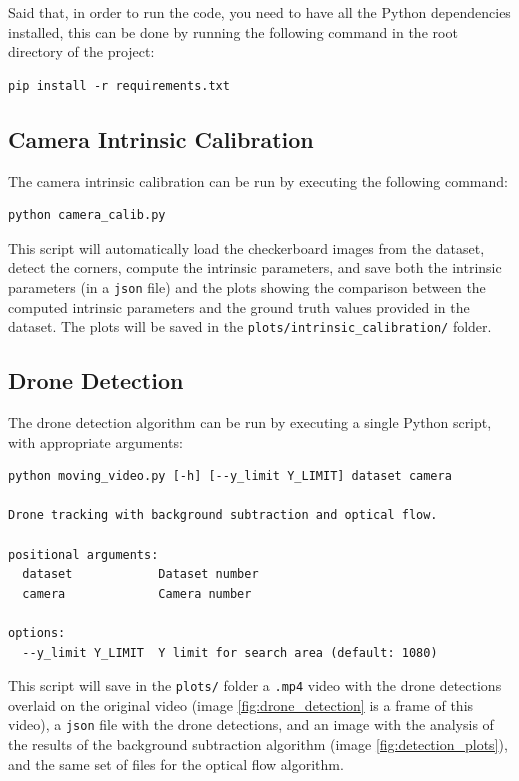 \documentclass[11pt]{article}
\begin{document}
Said that, in order to run the code, you need to have all the Python dependencies installed, this can be done by running the following command in the root directory of the project:

\begin{verbatim}
pip install -r requirements.txt
\end{verbatim}

\subsection{Camera Intrinsic Calibration}

The camera intrinsic calibration can be run by executing the following command:

\begin{verbatim}
python camera_calib.py
\end{verbatim}

This script will automatically load the checkerboard images from the dataset, detect the corners, compute the intrinsic parameters, and save both the intrinsic parameters (in a \texttt{json} file) and the plots showing the comparison between the computed intrinsic parameters and the ground truth values provided in the dataset. The plots will be saved in the \texttt{plots/intrinsic\_calibration/} folder.

\subsection{Drone Detection}

The drone detection algorithm can be run by executing a single Python script, with appropriate arguments:

\begin{verbatim}
python moving_video.py [-h] [--y_limit Y_LIMIT] dataset camera

Drone tracking with background subtraction and optical flow.

positional arguments:
  dataset            Dataset number
  camera             Camera number

options:
  --y_limit Y_LIMIT  Y limit for search area (default: 1080)
\end{verbatim}

This script will save in the \texttt{plots/} folder a \texttt{.mp4} video with the drone detections overlaid on the original video (image \ref{fig:drone_detection} is a frame of this video), a \texttt{json} file with the drone detections, and an image with the analysis of the results of the background subtraction algorithm (image \ref{fig:detection_plots}), and the same set of files for the optical flow algorithm.
\end{document}
